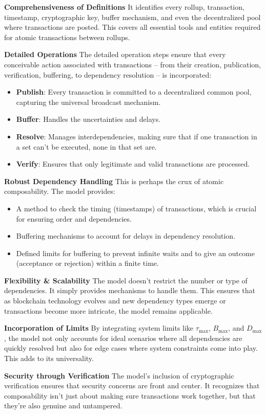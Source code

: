 \documentclass{article}
\begin{document}
\textbf{Comprehensiveness of Definitions} It identifies every rollup, transaction, timestamp, cryptographic key,
buffer mechanism, and even the decentralized pool where transactions are
posted. This covers all essential tools and entities required for atomic
transactions between rollups.

\textbf{Detailed Operations} The detailed operation steps ensure that every conceivable action associated with transactions -- from their creation, publication,
verification, buffering, to dependency resolution -- is incorporated:
\begin{itemize}
\item
  \textbf{Publish}: Every transaction is committed to a decentralized
  common pool, capturing the universal broadcast mechanism.
\item
  \textbf{Buffer}: Handles the uncertainties and delays.
\item
  \textbf{Resolve}: Manages interdependencies, making sure that if one
  transaction in a set can't be executed, none in that set are.
\item
  \textbf{Verify}: Ensures that only legitimate and valid transactions
  are processed.
\end{itemize}

\textbf{Robust Dependency Handling} This is perhaps the crux of atomic composability. The model provides:

\begin{itemize}
\item
  A method to check the timing (timestamps) of transactions, which is
  crucial for ensuring order and dependencies.
\item
  Buffering mechanisms to account for delays in dependency resolution.
\item
  Defined limits for buffering to prevent infinite waits and to give an
  outcome (acceptance or rejection) within a finite time.
\end{itemize}

\textbf{Flexibility \& Scalability} The model doesn't restrict the number or type of dependencies. It simply
provides mechanisms to handle them. This ensures that as blockchain
technology evolves and new dependency types emerge or transactions
become more intricate, the model remains applicable.

\textbf{Incorporation of Limits} By integrating system limits like \( \tau_{\text{max}} \), \( B_{\text{max}} \), and \( D_{\text{max}} \), the model not only accounts for ideal scenarios
where all dependencies are quickly resolved but also for edge cases
where system constraints come into play. This adds to its universality.

\textbf{Security through Verification} The model's inclusion of cryptographic verification ensures that security concerns are front and center. It recognizes that composability isn't just about making sure transactions work together, but that they're also genuine and untampered.



\end{document}
